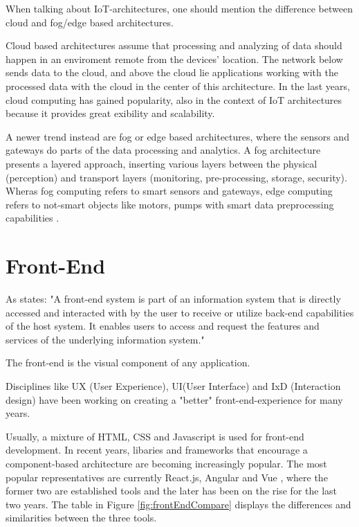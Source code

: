 When talking about IoT-architectures, one should mention the difference between cloud and fog/edge based architectures. 

Cloud based architectures assume that processing and analyzing of data should happen in an enviroment remote from the devices' location.
The network below sends data to the cloud, and above the cloud lie applications working with the processed data with the cloud in the center of this architecture.
In the last years, cloud computing has gained popularity, also in the context of IoT architectures \parencite{CloudComputing} because it provides great exibility and scalability.

A newer trend instead are fog or edge based architectures, where the sensors and gateways do parts of the data processing and analytics.
A fog architecture \parencite{FogComputing1, FogComp} presents a layered approach, inserting various layers between the physical (perception) and transport layers 
(monitoring, pre-processing, storage, security). 
Wheras fog computing refers to smart sensors and gateways, edge computing refers to not-smart objects like motors, pumps with 
smart data preprocessing capabilities \parencite{edgeFog}.


\section{Front-End}
As \parencite{frontendDef} states:
"A front-end system is part of an information system that is directly accessed and interacted with by the user to receive or 
utilize back-end capabilities of the host system. 
It enables users to access and request the features and services of the underlying information system."  

The front-end is the visual component of any application. 

Disciplines like UX (User Experience), UI(User Interface) and  IxD (Interaction design) have been working on creating 
a "better" front-end-experience for many years. 

Usually, a mixture of HTML, CSS and Javascript is used for front-end development. 
In recent years, libaries and frameworks that encourage a component-based architecture are becoming increasingly popular.
The most popular representatives are currently React.js, Angular and Vue \parencite{reactjsAngularVue} 
, where the former two are established tools and the later has been on the rise for the last two years.
The table in Figure \ref{fig:frontEndCompare} displays the differences and similarities between the three tools.

